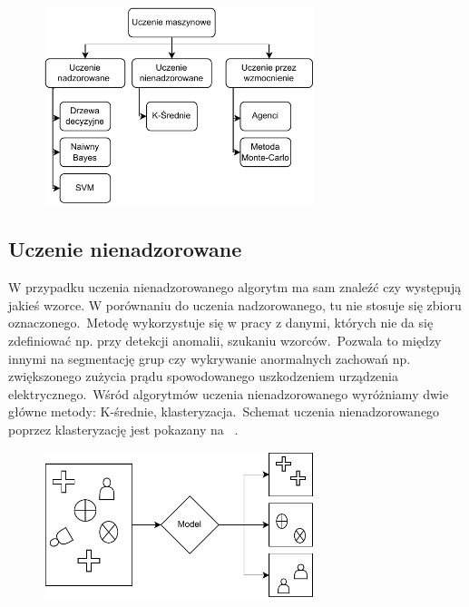 \begin{figure}[H]
    \centering
    \includegraphics[width=0.7\textwidth]{images/ml-przyklady}
    \label{fig:ml-schema}
\end{figure}

\subsection{Uczenie nienadzorowane}
W przypadku uczenia nienadzorowanego algorytm ma sam znaleźć czy występują jakieś wzorce. W porównaniu do uczenia nadzorowanego, tu nie stosuje się zbioru oznaczonego.\ Metodę wykorzystuje się w pracy z danymi, których nie da się zdefiniować np. przy detekcji anomalii, szukaniu wzorców.\ Pozwala to między innymi na segmentację grup czy wykrywanie anormalnych zachowań np. zwiększonego zużycia prądu spowodowanego uszkodzeniem urządzenia elektrycznego.\ Wśród algorytmów uczenia nienadzorowanego wyróżniamy dwie główne metody: K-średnie, klasteryzacja.\ Schemat uczenia nienadzorowanego poprzez klasteryzację jest pokazany na ~\cite{AiScience, Mahesh2018}.

\begin{figure}[H]
    \centering
    \includegraphics[width=0.7\textwidth]{images/unsupervised}
    \label{fig:unspervised}
\end{figure}


